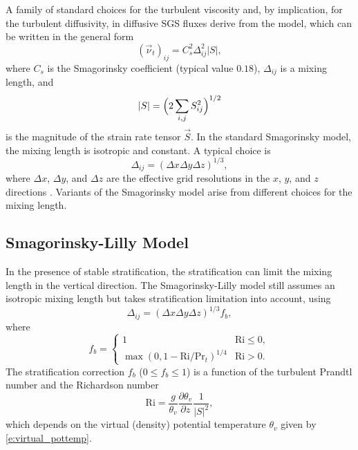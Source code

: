 \documentclass{report}
\begin{document}
A family of standard choices for the turbulent viscosity and, by implication, for the turbulent diffusivity, in diffusive SGS fluxes derive from the \citet{smagorinsky:1963} model, which can be written in the general form 
\begin{equation}
(\vec{\nu}_t)_{ij} = C_{s}^2 \Delta^{2}_{ij} |S|,   
\label{eq:eddy-viscosity_smag}
\end{equation}
where $C_{s} $ is the Smagorinsky coefficient (typical value $0.18$), $\Delta_{ij}$ is a mixing length, and 
\begin{equation}
|S| = \Bigl(2 \sum_{i,j} S_{ij}^2 \Bigr)^{1/2}
\end{equation} 
is the magnitude of the strain rate tensor $\vec{S}$. In the standard Smagorinsky model, the mixing length is isotropic and constant. A typical choice is 
\begin{equation}
    \Delta_{ij} = (\Delta x \Delta y \Delta z)^{1/3},
\end{equation}
where $\Delta x$, $\Delta y$, and $\Delta z$ are the effective grid resolutions in the $x$, $y$, and $z$ directions \citep{deardorff1970}. Variants of the Smagorinsky model arise from different choices for the mixing length.

\subsection{Smagorinsky-Lilly Model}

In the presence of stable stratification, the stratification can limit the mixing length  in the vertical direction. The Smagorinsky-Lilly model \citep{smagorinsky:1963, lilly:1962} still assumes an isotropic mixing length  but takes stratification limitation into account, using 
\begin{equation}\label{eq:smag-lilly}
\Delta_{ij} = (\Delta x \Delta y \Delta z)^{1/3} f_{b},   
\end{equation}
where 
\begin{equation}\label{eq:Lilly_strat}
f_{b} = 
    \begin{cases}
    1 & \mathrm{Ri} \leq 0 ,\\
    \max(0, 1 - \mathrm{Ri} / \mathrm{Pr}_{t})^{1/4} & \mathrm{Ri} > 0 .
    \end{cases}
\end{equation}
The stratification correction $f_{b}$ ($0 \leq f_b \leq 1$) is a function of the turbulent Prandtl number  and the Richardson number 
\[
\mathrm{Ri} = \frac{g}{\theta_v} \frac{\partial \theta_v}{\partial z} \frac{1}{{|S|}^2},
\]
which depends on the virtual (density) potential temperature $\theta_v$ given by \eqref{e:virtual_pottemp}.
 
\end{document}
